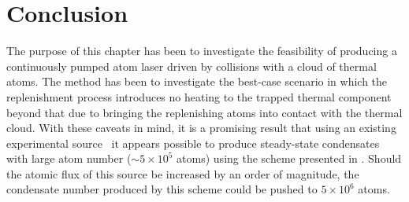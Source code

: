 




\section{Conclusion}

The purpose of this chapter has been to investigate the feasibility of producing a continuously pumped atom laser driven by  collisions with a cloud of thermal atoms.  The method has been to investigate the best-case scenario in which the replenishment process introduces no heating to the trapped thermal component beyond that due to bringing the replenishing atoms into contact with the thermal cloud.  With these caveats in mind, it is a promising result that using an existing experimental source~\citep{Muller:2007} it appears possible to produce steady-state condensates with large atom number ($\sim 5 \times 10^5$ atoms) using the scheme presented in .  Should the atomic flux of this source be increased by an order of magnitude, the condensate number produced by this scheme could be pushed to $5 \times 10^6$ atoms.

